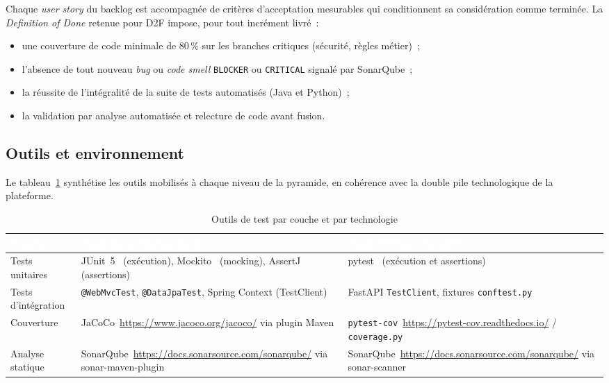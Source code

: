 \documentclass[12pt,a4paper]{report}
\renewcommand{\thead}[1]{\cellcolor{espritblue}\textcolor{white}{\textbf{#1}}}
\begin{document}
Chaque \textit{user story} du backlog est accompagnée de critères d'acceptation
mesurables qui conditionnent sa considération comme terminée. La \emph{Definition
of Done} retenue pour D2F impose, pour tout incrément livré~:

\begin{itemize}[leftmargin=1.2cm]
  \item une couverture de code minimale de 80\,\% sur les branches critiques
        (sécurité, règles métier)~;
  \item l'absence de tout nouveau \emph{bug} ou \emph{code smell}
        \texttt{BLOCKER} ou \texttt{CRITICAL} signalé par SonarQube~;
  \item la réussite de l'intégralité de la suite de tests automatisés
        (Java et Python)~;
  \item la validation par analyse automatisée et relecture de code avant fusion.
\end{itemize}

\subsection{Outils et environnement}

Le tableau~\ref{tab:test_tools} synthétise les outils mobilisés à chaque niveau
de la pyramide, en cohérence avec la double pile technologique de la plateforme.

\begin{table}[H]
\centering
\caption{Outils de test par couche et par technologie}
\label{tab:test_tools}
{\small\renewcommand{\arraystretch}{1.15}
\begin{tabularx}{\textwidth}{p{2.4cm} X X}
\toprule
\thead{Couche} & \thead{Stack Java (Spring Boot)} & \thead{Stack Python (FastAPI)} \\
\midrule
Tests unitaires & JUnit~5~\cite{junit5} (exécution), Mockito~\cite{mockito} (mocking), AssertJ (assertions) & pytest~\cite{pytest} (exécution et assertions) \\
Tests d'intégration & \texttt{@WebMvcTest}, \texttt{@DataJpaTest}, Spring Context (TestClient) & FastAPI \texttt{TestClient}, fixtures \texttt{conftest.py} \\
Couverture & JaCoCo~\url{https://www.jacoco.org/jacoco/} via plugin Maven & \texttt{pytest-cov}~\url{https://pytest-cov.readthedocs.io/} / \texttt{coverage.py} \\
Analyse statique & SonarQube~\url{https://docs.sonarsource.com/sonarqube/} via sonar-maven-plugin & SonarQube~\url{https://docs.sonarsource.com/sonarqube/} via sonar-scanner \\
\bottomrule
\end{tabularx}}
\end{table}
\end{document}
